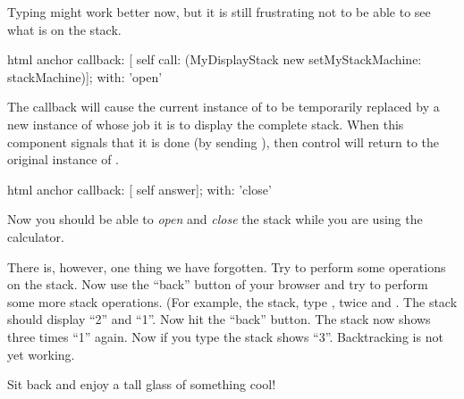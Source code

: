 \documentclass[a4paper,10pt,twoside]{book}
\begin{document}
Typing might work better now, but it is still frustrating not to be able to see what is on the stack.


\begin{code}{}
html anchor
	callback: [ self call: (MyDisplayStack new setMyStackMachine: stackMachine)];
	with: 'open'
\end{code}

The callback will cause the current instance of  to be temporarily replaced by a new instance of  whose job it is to display the complete stack.
When this component signals that it is done (\ie by sending ), then control will return to the original instance of .


\begin{code}{}
html anchor
	callback: [ self answer];
	with: 'close'
\end{code}


Now you should be able to \emph{open} and \emph{close} the stack while you are using the calculator.

There is, however, one thing we have forgotten.
Try to perform some operations on the stack.
Now use the ``back'' button of your browser and try to perform some more stack operations.
(For example,  the stack, type ,  twice and \menu {+}.
The stack should display ``2'' and ``1''.
Now hit the ``back'' button.
The stack now shows three times ``1'' again.
Now if you type \menu{+} the stack shows ``3''.
Backtracking is not yet working.


Sit back and enjoy a tall glass of something cool!

\end{document}
